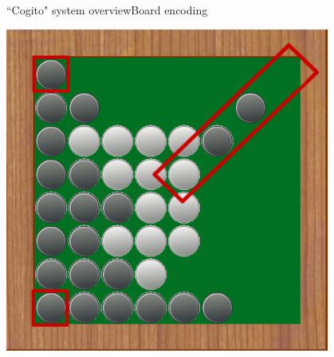 \begin{frame}{``Cogito" system overview}{Board encoding}
\begin{minipage}{0.45\textwidth}
{			\includegraphics[width=0.8\textwidth]{img/cogito/raisonneur_choix_2}	
		}
	\end{minipage}
	\begin{minipage}{0.50\textwidth}
		\begin{itemize}
		\end{itemize}
	\end{minipage}
\end{frame}

